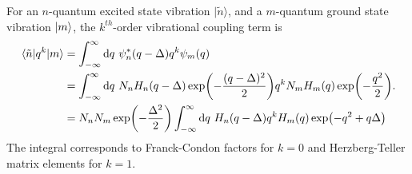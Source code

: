 \documentclass[aip, jcp, reprint, onecolumn, nofootinbib]{revtex4-2}
\begin{document}
For an $n$-quantum excited state vibration $| \tilde{n} \rangle$, and a $m$-quantum ground state vibration $\ket{m}$, the $k^{th}$-order vibrational coupling term is
\begin{equation}
	\begin{split}
		\mel{\tilde{n}}{q^k}{m} &= \int_{-\infty}^\infty \mathrm{d}q \ \psi^*_n(q-\Delta) q^k \psi_m(q)\\
		&= \int_{-\infty}^\infty \mathrm{d}q \ N_n H_n(q-\Delta) \exp(-\frac{(q - \Delta)^2}{2}) q^k N_m H_m(q) \exp(-\frac{q^2}{2}). \\
		&= N_n N_m \exp(-\frac{\Delta^2}{2}) \int_{-\infty}^\infty \mathrm{d}q \ H_n(q-\Delta) q^k H_m(q) \exp(-q^2 + q\Delta)
	\end{split}\label{key}
\end{equation}
The integral corresponds to Franck-Condon factors for $k=0$ and Herzberg-Teller matrix elements for $k=1$.
\end{document}
